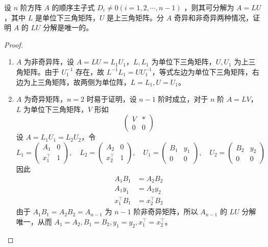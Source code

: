 \begin{exercise}
    设 $n$ 阶方阵 $A$ 的顺序主子式 $D_i \neq 0(i=1,2, \cdots, n-1)$ ，则其可分解为 $A=L U$ ，其中 $L$ 是单位下三角矩阵，$U$ 是上三角矩阵。分 $A$ 奇异和非奇异两种情况，证明 $A$ 的 $L U$ 分解是唯一的。
\end{exercise}
\begin{proof}
    \begin{enumerate}
        \item $A$ 为非奇异阵，设 $A=LU=L_1U_1$，$L, L_1$ 为单位下三角矩阵，$U, U_1$ 为上三角矩阵。由于 $U_1^{-1}$ 存在，故 $L^{-1}L_1=UU_1^{-1}$，等式左边为单位下三角矩阵，右边为上三角矩阵，故两侧为单位阵，$L=L_1, U=U_1$。
        \item $A$ 为奇异矩阵，$n=2$ 时易于证明，设 $n-1$ 阶时成立，对于 $n$ 阶 $A=LV$，$L$ 为单位下三角矩阵，$V$ 形如
              \[
                  \begin{pmatrix}
                      V & * \\
                      0 & 0
                  \end{pmatrix}
              \]
              设 $A=L_1U_1=L_2U_2$，令
              \[
                  L_1=\begin{pmatrix}
                      A_1        & 0 \\
                      x_1^{\top} & 1
                  \end{pmatrix}, \quad
                  L_2=\begin{pmatrix}
                      A_2        & 0 \\
                      x_2^{\top} & 1
                  \end{pmatrix}, \quad
                  U_1=\begin{pmatrix}
                      B_1 & y_1 \\
                      0   & 0
                  \end{pmatrix}, \quad
                  U_2=\begin{pmatrix}
                      B_2 & y_2 \\
                      0   & 0
                  \end{pmatrix}
              \]
              因此
              \[
                  \begin{aligned}
                      A_1B_1        & = A_2B_2        \\
                      A_1y_1        & = A_2y_2        \\
                      x_1^{\top}B_1 & = x_2^{\top}B_2
                  \end{aligned}
              \]
              由于 $A_1B_1=A_2B_2=A_{n-1}$ 为 $n-1$ 阶非奇异矩阵，所以 $A_{n-1}$ 的 $LU$ 分解唯一，从而 $A_1=A_2, B_1=B_2, y_1=y_2, x_1^{\top}=x_2^{\top}$。
    \end{enumerate}
\end{proof}

